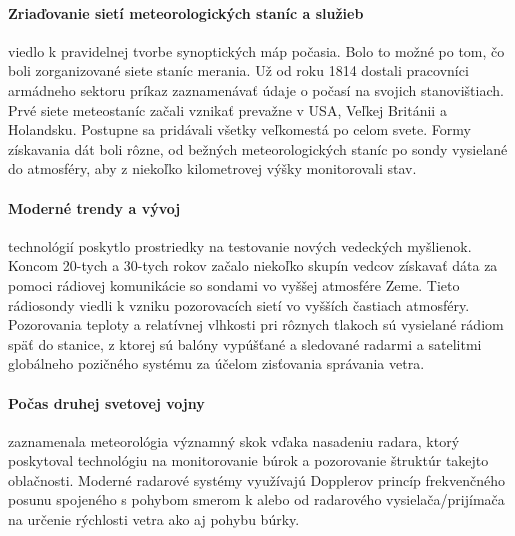 \paragraph{Zriaďovanie sietí meteorologických staníc a služieb} viedlo k pravidelnej tvorbe synoptických máp počasia. Bolo to možné po tom, čo boli zorganizované siete staníc merania. Už od roku 1814 dostali pracovníci armádneho sektoru príkaz zaznamenávať údaje o počasí na svojich stanovištiach. Prvé siete meteostaníc začali vznikať prevažne v USA, Veľkej Británii a Holandsku. Postupne sa pridávali všetky veľkomestá po celom svete. Formy získavania dát boli rôzne, od bežných meteorologických staníc po sondy vysielané do atmosféry, aby z niekoľko kilometrovej výšky monitorovali stav. 

\paragraph{Moderné trendy a vývoj} technológií poskytlo prostriedky na testovanie nových vedeckých myšlienok. Koncom 20-tych a 30-tych rokov začalo niekoľko skupín vedcov získavať dáta za pomoci rádiovej komunikácie so sondami vo vyššej atmosfére Zeme. Tieto rádiosondy viedli k vzniku pozorovacích sietí vo vyšších častiach atmosféry. Pozorovania teploty a relatívnej vlhkosti pri rôznych tlakoch sú vysielané rádiom späť do stanice, z ktorej sú balóny vypúšťané a sledované radarmi a satelitmi globálneho pozičného systému za účelom zisťovania správania vetra.

\paragraph{Počas druhej svetovej vojny} zaznamenala meteorológia významný skok vďaka nasadeniu radara, ktorý poskytoval technológiu na monitorovanie búrok a pozorovanie štruktúr takejto oblačnosti. Moderné radarové systémy využívajú Dopplerov princíp frekvenčného posunu spojeného s pohybom smerom k alebo od radarového vysielača/prijímača na určenie rýchlosti vetra ako aj pohybu búrky.

